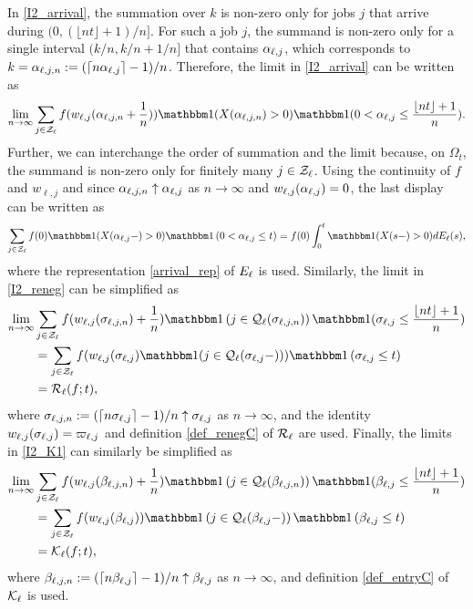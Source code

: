 \documentclass{article}
\theoremstyle{definition}
\numberwithin{equation}{section}
\begin{document}
In \eqref{I2_arrival}, the summation over $k$ is non-zero only for jobs $j$ that arrive during $(0,(\lfloor nt\rfloor+1)/n]$. For such a job $j$, the summand is non-zero only for a single interval $(k/n,k/n+1/n]$ that contains $\alpha_{\ell,j}$, which corresponds to $k=\alpha_{\ell,j,n}:=(\lceil n\alpha_{\ell,j}\rceil-1)/n$. Therefore, the limit in \eqref{I2_arrival} can be written as
\begin{align*}
  \lim_{n\to\infty}\sum_{j\in\indexSet_\ell}f(w_{\ell,j}(\arrivaltime_{\ell,j,n}+\frac{1}{n})) \indicil{X(\arrivaltime_{\ell,j,n})>0}\indicil{0<\arrivaltime_{\ell,j}\leq\frac{\lfloor nt\rfloor+1}{n}}.
\end{align*}
Further, we can interchange the order of summation and the limit because, on $\Omega_t$, the summand is non-zero only for finitely many $j\in\mathcal{Z}_\ell$. Using the continuity of $f $ and $w_{\ell,j}$ and since $\alpha_{\ell,j,n}\uparrow \alpha_{\ell,j}$ as $n\to\infty$ and $w_{\ell,j}(\alpha_{\ell,j})=0$, the last display can be written as
\[
  \sum_{j\in\indexSet_\ell}f(0)\indicil{X(\arrivaltime_{\ell,j}-)>0}\indic{0<\arrivaltime_{\ell,j}\leq t}= f(0)\int_0^t\indicil{X(s-)>0} d \arrival_{\ell}(s),
\]
where the representation \eqref{arrival_rep} of $E_\ell$ is used.
Similarly, the limit in \eqref{I2_reneg} can be simplified as
\begin{align*}
\lim_{n\to\infty}&\sum_{j\in\indexSet_\ell}f(w_{\ell,j}(\renegtime_{\ell,j,n})+\frac{1}{n})\indic{j\in\inque_\ell(\renegtime_{\ell,j,n})}\indicil{\renegtime_{\ell,j}\leq \frac{\lfloor nt\rfloor+1}{n}}\\
  &=  \sum_{j\in\indexSet_\ell} f(w_{\ell,j}(\renegtime_{\ell,j})\indicil{j\in\inque_\ell(\renegtime_{\ell,j}-)})\indic{\renegtime_{\ell,j}\leq t}\\
  & =\renegC_\ell(f;t),
\end{align*}
where $\sigma_{\ell,j,n}:=(\lceil n\sigma_{\ell,j}\rceil-1)/n\uparrow\sigma_{\ell,j}$ as $n\to\infty$, and the identity $w_{\ell,j}(\sigma_{\ell,j})=\varpi_{\ell,j}$ and definition \eqref{def_renegC} of $\mathcal{R}_\ell$ are used.
Finally, the limits in \eqref{I2_K1} can similarly be simplified as
\begin{align*}
  \lim_{n\to\infty}&\sum_{j\in\indexSet_\ell}f(w_{\ell,j}(\entrytime_{\ell,j,n})+\frac{1}{n})\indic{j\in\inque_\ell(\entrytime_{\ell,j,n})}\indicil{\entrytime_{\ell,j}\leq \frac{\lfloor nt\rfloor+1}{n}}\\
  &=  \sum_{j\in\indexSet_\ell} f(w_{\ell,j}(\entrytime_{\ell,j}))\indic{j\in\inque_\ell(\entrytime_{\ell,j}-)}\indic{\entrytime_{\ell,j}\leq t}\\
&  =\entryC_\ell(f;t),
\end{align*}
where $\beta_{\ell,j,n}:=(\lceil n\beta_{\ell,j}\rceil-1)/n\uparrow\beta_{\ell,j}$ as $n\to\infty$, and definition \eqref{def_entryC} of $\mathcal{K}_\ell$ is used.
\end{document}
